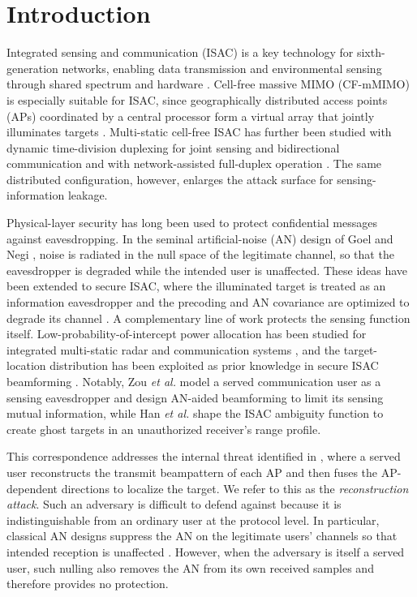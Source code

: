 \documentclass[letterpaper,journal]{IEEEtran}
\begin{document}
\section{Introduction}
Integrated sensing and communication (ISAC) is a key technology for sixth-generation networks, enabling data transmission and environmental sensing through shared spectrum and hardware \cite{liu2022jsac}. Cell-free massive MIMO (CF-mMIMO) is especially suitable for ISAC, since geographically distributed access points (APs) coordinated by a central processor form a virtual array that jointly illuminates targets \cite{demirhan2024cellfreetcom,behdad2024multistatic}. Multi-static cell-free ISAC has further been studied with dynamic time-division duplexing for joint sensing and bidirectional communication \cite{chowdhury2026dtdd} and with network-assisted full-duplex operation \cite{sun2026nafd}. The same distributed configuration, however, enlarges the attack surface for sensing-information leakage.

Physical-layer security has long been used to protect confidential messages against eavesdropping. In the seminal artificial-noise (AN) design of Goel and Negi \cite{goel2008guaranteeing}, noise is radiated in the null space of the legitimate channel, so that the eavesdropper is degraded while the intended user is unaffected. These ideas have been extended to secure ISAC, where the illuminated target is treated as an information eavesdropper and the precoding and AN covariance are optimized to degrade its channel \cite{su2021secure,rivetti2024secure,ren2023securecf}. A complementary line of work protects the sensing function itself. Low-probability-of-intercept power allocation has been studied for integrated multi-static radar and communication systems \cite{shi2020lpi}, and the target-location distribution has been exploited as prior knowledge in secure ISAC beamforming \cite{hou2024targetdist}. Notably, Zou \emph{et al.} \cite{zou2024securing} model a served communication user as a sensing eavesdropper and design AN-aided beamforming to limit its sensing mutual information, while Han \emph{et al.} \cite{han2026sensingsecure} shape the ISAC ambiguity function to create ghost targets in an unauthorized receiver's range profile.

This correspondence addresses the internal threat identified in \cite{dasilva2023multistaticcf}, where a served user reconstructs the transmit beampattern of each AP and then fuses the AP-dependent directions to localize the target. We refer to this as the \emph{reconstruction attack}. Such an adversary is difficult to defend against because it is indistinguishable from an ordinary user at the protocol level. In particular, classical AN designs suppress the AN on the legitimate users' channels so that intended reception is unaffected \cite{goel2008guaranteeing,rivetti2024secure}. However, when the adversary is itself a served user, such nulling also removes the AN from its own received samples and therefore provides no protection.
\end{document}
